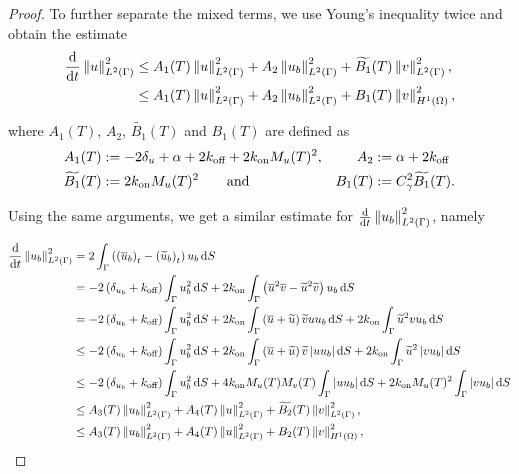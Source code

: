 \begin{proof}
    \noindent
    To further separate the mixed terms, we use Young's inequality twice and obtain the estimate
%
    \begin{equation*}
    \begin{aligned}
        \frac{\mathop{}\!\mathrm{d}}{\mathop{}\!\mathrm{d} t} \left\| u \right\|_{L^2(\Gamma)}^2 &\leq A_1(T) \left\| u \right\|_{L^2(\Gamma)}^2 + A_2 \left\| u_b \right\|_{L^2(\Gamma)}^2 + \widetilde{B_1}(T) \left\| v \right\|_{L^2(\Gamma)}^2 , \\
        &\leq A_1(T) \left\| u \right\|_{L^2(\Gamma)}^2 + A_2 \left\| u_b \right\|_{L^2(\Gamma)}^2 + B_1(T) \left\| v \right\|_{H^1(\Omega)}^2 , \\
    \end{aligned}
    \end{equation*}

    \noindent
    where $A_1(T)$, $A_2$, $\widetilde{B_1}(T)$ and $B_1(T)$ are defined as
%
    \begin{equation*}
        \begin{aligned}
            A_1(T) &:= - 2 \delta_u + \alpha + 2 k_\text{off} + 2 k_\text{on} M_u (T)^2 ,& A_2 &:= \alpha + 2 k_\text{off} \\
            \widetilde{B_1}(T) &:= 2 k_\text{on} M_u (T)^2 \qquad \text{and} & B_1(T) &:= C_\gamma^2 \widetilde{B_1}(T) .
        \end{aligned}
    \end{equation*}

    \noindent
    Using the same arguments, we get a similar estimate for $\frac{\mathop{}\!\mathrm{d}}{\mathop{}\!\mathrm{d} t} \left\| u_b \right\|_{L^2(\Gamma)}^2$, namely

    \begingroup
    \allowdisplaybreaks
    \begin{align*}
        \frac{\d}{\d t} \norm{u_b}_{\Ltwo{\Gamma}}^2 &= 2 \int_\Gamma \left(\left(\ubb\right)_t - \left(\ubt\right)_t\right) u_b \d S \\
        &= - 2 \left(\delta_{u_b} + \koff\right) \int_\Gamma u_b^2 \d S + 2 \kon \int_\Gamma \left(\ub^2 \vb - \ut^2 \vt\right) u_b \d S \\
        &= - 2 \left(\delta_{u_b} + \koff\right) \int_\Gamma u_b^2 \d S + 2 \kon \int_\Gamma \left(\ub + \ut\right) \vt u u_b \d S + 2 \kon \int_\Gamma \ut^2 v u_b \d S \\
        &\leq - 2 \left(\delta_{u_b} + \koff\right) \int_\Gamma u_b^2 \d S + 2 \kon \int_\Gamma \left(\ub + \ut\right) \vt \left| u u_b \right| \d S + 2 \kon \int_\Gamma \ut^2 \left| v u_b \right| \d S \\
        &\leq - 2 \left(\delta_{u_b} + \koff\right) \int_\Gamma u_b^2 \d S + 4 \kon M_u(T) M_v(T) \int_\Gamma \left| u u_b \right| \d S + 2 \kon M_u(T)^2 \int_\Gamma \left| v u_b \right| \d S \\
        &\leq A_3(T) \norm{u_b}_{\Ltwo{\Gamma}}^2 + A_4(T) \norm{u}_{\Ltwo{\Gamma}}^2 + \widetilde{B_2}(T) \norm{v}_{\Ltwo{\Gamma}}^2 ,\\
        &\leq A_3(T) \norm{u_b}_{\Ltwo{\Gamma}}^2 + A_4(T) \norm{u}_{\Ltwo{\Gamma}}^2 + B_2(T) \norm{v}_{H^1(\Omega)}^2 ,\\
    \end{align*}
    \endgroup


\end{proof}
